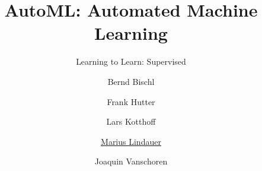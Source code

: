




\title[AutoML: Learning to Control]{AutoML: Automated Machine Learning}
\subtitle{Learning to Learn: Supervised}
\author[Marius Lindauer]{Bernd Bischl \and Frank Hutter \and Lars Kotthoff\newline \and \underline{Marius Lindauer} \and Joaquin Vanschoren}
\institute{}
\date{}





	
	\maketitle
	


